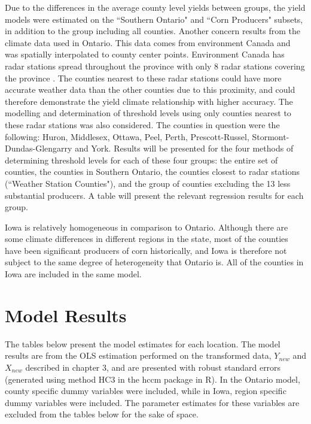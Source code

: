 Due to the differences in the average county level yields between groups, the yield models were estimated on the ``Southern Ontario" and ``Corn Producers" subsets, in addition to the group including all counties. Another concern results from the climate data used in Ontario. This data comes from environment Canada and was spatially interpolated to county center points. Environment Canada has radar stations spread throughout the province with only 8 radar stations covering the province \citep{EnvirCan}. The counties nearest to these radar stations could have more accurate weather data than the other counties due to this proximity, and could therefore demonstrate the yield climate relationship with higher accuracy. The modelling and determination of threshold levels using only counties nearest to these radar stations was also considered. The counties in question were the following: Huron, Middlesex, Ottawa, Peel, Perth, Prescott-Russel, Stormont-Dundas-Glengarry and York. Results will be presented for the four methods of determining threshold levels for each of these four groups: the entire set of counties, the counties in Southern Ontario, the counties closest to radar stations (``Weather Station Counties"), and the group of counties excluding the 13 less substantial producers. A table will present the relevant regression results for each group.

Iowa is relatively homogeneous in comparison to Ontario. Although there are some climate differences in different regions in the state, most of the counties have been significant producers of corn historically, and Iowa is therefore not subject to the same degree of heterogeneity that Ontario is. All of the counties in Iowa are included in the same model.

\section{Model Results}

The tables below present the model estimates for each location. The model results are from the OLS estimation performed on the transformed data, $Y_{new}$ and $X_{new}$ described in chapter 3, and are presented with robust standard errors (generated using method HC3 in the hccm package in R). In the Ontario model, county specific dummy variables were included, while in Iowa, region specific dummy variables were included. The parameter estimates for these variables are excluded from the tables below for the sake of space.


